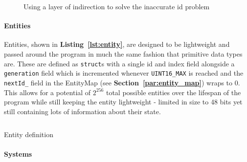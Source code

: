 \documentclass[10pt]{scrartcl}
\begin{document}
	\begin{figure}[H]
		\centering
		\caption{Using a layer of indirection to solve the inaccurate id problem}
		\label{fig:indirection}
	\end{figure}


	\paragraph{Entities} %
	\label{par:entities}
	Entities, shown in \textbf{Listing~\ref{lst:entity}}, are designed to be lightweight and passed around the program in much the same fashion that primitive data types are. These are defined as \texttt{struct}s with a single id and index field alongside a \texttt{generation} field which is incremented whenever \texttt{UINT16_MAX} is reached and the \texttt{nextId_} field in the EntityMap (see \textbf{Section~\ref{par:entity_map}}) wraps to 0. This allows for a potential of $2^{256}$ total possible entities over the lifespan of the program while still keeping the entity lightweight - limited in size to 48 bits yet still containing lots of information about their state.
	
	\begin{listing}[H]
	\inputminted[bgcolor=backcode,style=native]{cpp}{code/entity.cpp}
	\caption{Entity definition}
	\label{lst:entity}
	\end{listing}


	\paragraph{Systems} %
	\label{par:systems}
\end{document}
